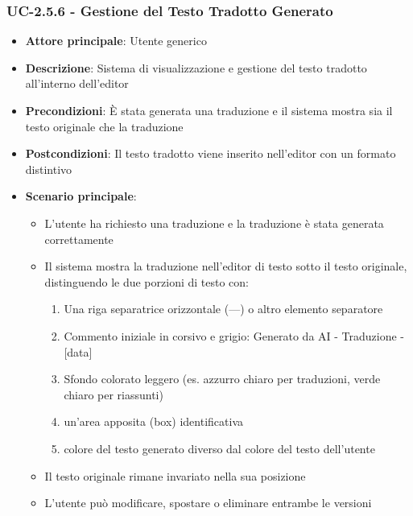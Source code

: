 \documentclass[11pt,a4paper]{article}
\begin{document}
\subsubsection{UC-2.5.6 - Gestione del Testo Tradotto Generato}
\begin{itemize}
    \item \textbf{Attore principale}: Utente generico
    \item \textbf{Descrizione}: Sistema di visualizzazione e gestione del testo tradotto all'interno dell'editor
    \item \textbf{Precondizioni}: È stata generata una traduzione e il sistema mostra sia il testo originale che la traduzione
    \item \textbf{Postcondizioni}: Il testo tradotto viene inserito nell'editor con un formato distintivo
    \item \textbf{Scenario principale}:
        \begin{itemize}
            \item L'utente ha richiesto una traduzione e la traduzione è stata generata correttamente
            \item Il sistema mostra la traduzione nell'editor di testo sotto il testo originale, distinguendo le due porzioni di testo con:
                \begin{enumerate}
                    \item Una riga separatrice orizzontale (---) o altro elemento separatore
                    \item Commento iniziale in corsivo e grigio: Generato da AI - Traduzione - [data]
                    \item Sfondo colorato leggero (es. azzurro chiaro per traduzioni, verde chiaro per riassunti)
                    \item un’area apposita (box) identificativa
                    \item colore del testo generato diverso dal colore del testo dell’utente
                \end{enumerate}
            \item Il testo originale rimane invariato nella sua posizione
            \item L'utente può modificare, spostare o eliminare entrambe le versioni
        \end{itemize}
\end{itemize}
\end{document}
